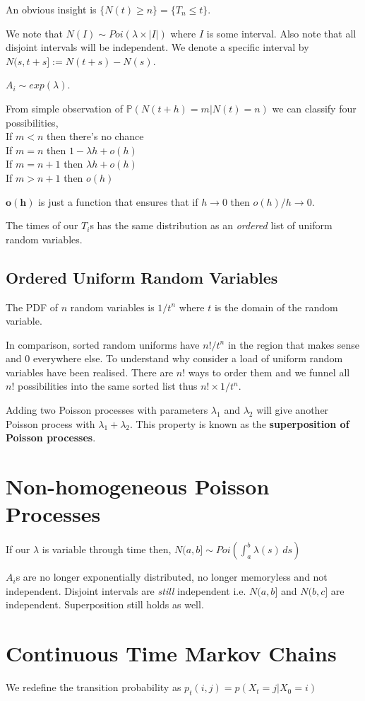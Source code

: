 \documentclass[10pt,landscape,a4paper]{article}
\begin{document}
\begin{multicols*}{4}
An obvious insight is $\{N(t) \geq n\} = \{T_n \leq t\}$.

We note that $N(I) \sim Poi(\lambda \times |I|)$ where $I$ is some interval.
Also note that all disjoint intervals will be independent.
We denote a specific interval by $N(s,t+s] := N(t+s) - N(s)$.

$A_i \sim exp(\lambda)$.

From simple observation of $\mathbb{P}(N(t+h) = m | N(t) = n)$ we can classify
four possibilities, \\
If $m < n$ then there's no chance \\
If $m = n$ then $1 - \lambda h + o(h)$ \\
If $m = n+1$ then $\lambda h + o(h)$ \\
If $m > n+1$ then $o(h)$

$\bm{o(h)}$ is just a function that ensures that if $h \to 0$ then $o(h)/h \to 0$.

The times of our $T_i$s has the same distribution as an \emph{ordered} list of
uniform random variables.
\subsection{Ordered Uniform Random Variables}
The PDF of $n$ random variables is $1/t^n$ where $t$ is the domain of the
random variable.

In comparison, sorted random uniforms have $n!/t^n$ in the
region that makes sense and 0 everywhere else. To understand why consider a load
of uniform random variables have been realised. There are $n!$ ways to order
them and we funnel all $n!$ possibilities into the same sorted list thus
$n! \times 1/t^n$.

Adding two Poisson processes with parameters $\lambda_1$ and $\lambda_2$ will
give another Poisson process with $\lambda_1 + \lambda_2$. This property is
known as the \textbf{superposition of Poisson processes}.
\section{Non-homogeneous Poisson Processes}
If our $\lambda$ is variable through time then,
$N(a,b] \sim Poi\left(\int_a^b \lambda(s)\,ds\right)$

$A_i$s are no longer exponentially distributed, no longer memoryless and
not independent. Disjoint intervals are \emph{still} independent
i.e. $N(a,b]$ and $N(b,c]$ are independent. Superposition still holds as well.
\section{Continuous Time Markov Chains}
We redefine the transition probability as $p_t(i,j) = p(X_t = j | X_0 = i)$


\end{multicols*}
\end{document}
